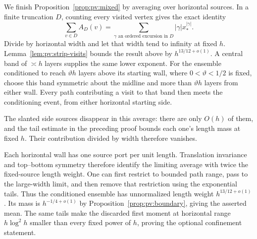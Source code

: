 We finish Proposition~\ref{prop:pv:mixed} by averaging over horizontal
sources. In a finite truncation $D$, counting every visited vertex gives
the exact identity
\[
 \sum_{v\in D} A_D(v)
 =\sum_{\gamma\text{ an ordered excursion in }D}
   |\gamma|x_*^{|\gamma|}.
\]
Divide by horizontal width and let that width tend to infinity at fixed
$h$. Lemma~\ref{lem:pv:strip-visits} bounds the result above by
$h^{13/12+o(1)}$. A central band of $\asymp h$ layers supplies the same
lower exponent. For the ensemble conditioned to reach $\vartheta h$
layers above its starting wall, where $0<\vartheta<1/2$ is fixed,
choose this band symmetric about the midline and more than
$\vartheta h$ layers from either wall. Every
path contributing a visit to that band then meets the conditioning
event, from either horizontal starting side.

The slanted side sources disappear in this average: there are only
$O(h)$ of them, and the tail estimate in the preceding proof bounds
each one's length mass at fixed $h$. Their contribution divided by
width therefore vanishes.

Each horizontal wall has one source port per unit length. Translation
invariance and top--bottom symmetry therefore identify the limiting
average with twice the fixed-source length weight. One can first
restrict to bounded path range, pass to
the large-width limit, and then remove that restriction using the
exponential tails. Thus the conditioned ensemble has unnormalized
length weight $h^{13/12+o(1)}$. Its mass is $h^{-1/4+o(1)}$ by
Proposition~\ref{prop:pv:boundary}, giving the asserted mean. The same
tails make the discarded first moment at horizontal range
$h\log^2 h$ smaller than every fixed power of $h$, proving the optional
confinement statement.
